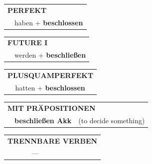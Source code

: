 \documentclass[10pt,a4paper]{revtex4-2}
\begin{document}
\begin{verbbox-acc}
\vspace{10pt}

\begin{tabular}{rl}
\multicolumn{2}{l}{\textbf{PERFEKT}}\\
& haben + \textbf{beschlossen}\\
\end{tabular}
\hfill
\begin{tabular}{rl}
\multicolumn{2}{l}{\textbf{FUTURE I}}\\
& werden + \textbf{beschließen}\\
\end{tabular}
\hfill
\begin{tabular}{rl}
\multicolumn{2}{l}{\textbf{PLUSQUAMPERFEKT}}\\
& hatten + \textbf{beschlossen}\\
\end{tabular}

\vspace{10pt}

\begin{tabular}{lll}
\multicolumn{3}{l}{\textbf{MIT PRÄPOSITIONEN}}\\
& \textbf{beschließen Akk} & (to decide something)\\
\end{tabular}
\hfill
\begin{tabular}{lll}
\multicolumn{3}{l}{\textbf{TRENNBARE VERBEN}}\\
& ---\\
\end{tabular}

\vspace{-5pt}
\end{verbbox-acc}
\end{document}
